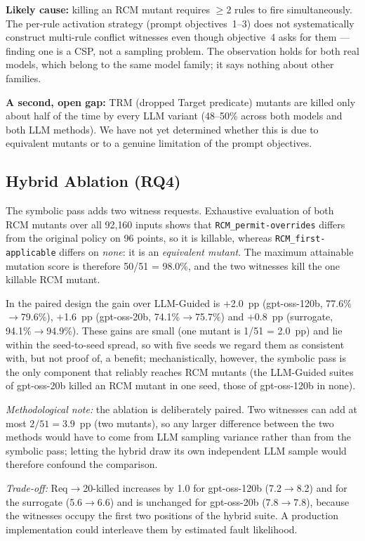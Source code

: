 \documentclass[conference]{IEEEtran}
\begin{document}
\textbf{Likely cause:} killing an RCM mutant requires $\geq$2 rules to fire
simultaneously. The per-rule activation strategy (prompt objectives~1--3) does
not systematically construct multi-rule conflict witnesses even though
objective~4 asks for them --- finding one is a CSP, not a sampling problem.
The observation holds for both real models, which belong to the same model
family; it says nothing about other families.

\textbf{A second, open gap:} TRM (dropped Target predicate) mutants are killed
only about half of the time by every LLM variant (48--50\% across both models and both LLM methods). We
have not yet determined whether this is due to equivalent mutants or to a
genuine limitation of the prompt objectives.

\subsection{Hybrid Ablation (RQ4)}
\label{sec:rq4}

The symbolic pass adds two witness requests. Exhaustive evaluation of both RCM
mutants over all 92{,}160 inputs shows that \texttt{RCM\_permit-overrides}
differs from the original policy on 96 points, so it is killable, whereas
\texttt{RCM\_first-applicable} differs on \textit{none}: it is an
\textit{equivalent mutant}. The maximum attainable mutation score is
therefore 50/51 = 98.0\%, and the two witnesses kill the one killable RCM
mutant.

In the paired design the gain over LLM-Guided is $+$2.0~pp (gpt-oss-120b,
77.6\%$\to$79.6\%), $+$1.6~pp (gpt-oss-20b, 74.1\%$\to$75.7\%) and $+$0.8~pp
(surrogate, 94.1\%$\to$94.9\%). These gains are small (one mutant is
1/51 = 2.0~pp) and lie within the seed-to-seed spread, so with five seeds we
regard them as consistent with, but not proof of, a benefit; mechanistically,
however, the symbolic pass is the only component that reliably reaches RCM
mutants (the LLM-Guided suites of gpt-oss-20b killed an RCM mutant in one seed,
those of gpt-oss-120b in none).

\textit{Methodological note:} the ablation is deliberately paired. Two
witnesses can add at most $2/51 = 3.9$~pp (two mutants), so any larger
difference between the two methods would have to come from LLM sampling
variance rather than from the symbolic pass; letting the hybrid draw its own
independent LLM sample would therefore confound the comparison.

\textit{Trade-off:} Req$\to$20-killed increases by 1.0 for gpt-oss-120b
(7.2$\to$8.2) and for the surrogate (5.6$\to$6.6) and is unchanged for
gpt-oss-20b (7.8$\to$7.8), because the witnesses occupy the first two
positions of the hybrid suite. A production implementation could interleave
them by estimated fault likelihood.
\end{document}
